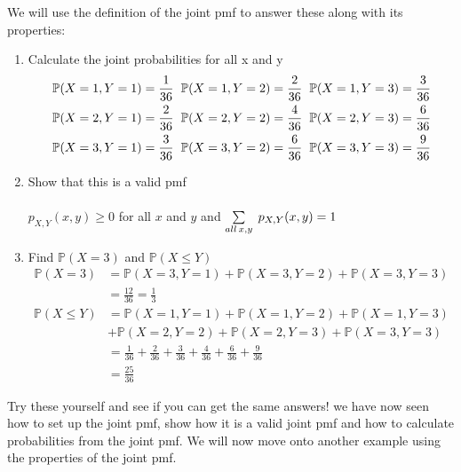 \documentclass[,oneside]{article}
\begin{document}
\begin{enumerate}
\begin{enumerate}
\end{enumerate}
We will use the definition of the joint pmf to answer these along with its properties:\\
\begin{enumerate}
\item Calculate the joint probabilities for all x and y
\begin{align*}
\mathbb{P}(X = 1, Y = 1) = \frac{1}{36} \hspace{0.2cm} \mathbb{P}(X = 1, Y = 2) = \frac{2}{36} \hspace{0.2cm} \mathbb{P}(X = 1, Y = 3) = \frac{3}{36}\\
\mathbb{P}(X = 2, Y = 1) = \frac{2}{36} \hspace{0.2cm} \mathbb{P}(X = 2, Y = 2) = \frac{4}{36} \hspace{0.2cm} \mathbb{P}(X = 2, Y = 3) = \frac{6}{36}\\
\mathbb{P}(X = 3, Y = 1) = \frac{3}{36} \hspace{0.2cm} \mathbb{P}(X = 3, Y = 2) = \frac{6}{36}\hspace{0.2cm}  \mathbb{P}(X = 3, Y = 3) = \frac{9}{36}
\end{align*}
\item Show that this is a valid pmf\\ \\
$p_{X,Y}(x,y) \geq 0$ for all $x$ and $y$ and $\sum\limits_{all \hspace{0.05cm}x,y} \hspace{0.1cm}p_{X,Y}(x,y)=1$\\
\item Find $\mathbb{P}(X = 3)$ and $\mathbb{P}(X \leq Y)$
\begin{align*}
\mathbb{P}(X=3)&=\mathbb{P}(X = 3, Y = 1)+\mathbb{P}(X = 3, Y = 2)+ \mathbb{P}(X = 3, Y = 3)\\
&= \frac{12}{36} = \frac{1}{3}
\end{align*}
\begin{align*}
\mathbb{P}(X \leq Y) &= \mathbb{P}(X = 1, Y = 1)+\mathbb{P}(X = 1, Y = 2)+\mathbb{P}(X = 1, Y = 3)\\
&+\mathbb{P}(X = 2, Y = 2)+\mathbb{P}(X = 2, Y = 3)+\mathbb{P}(X = 3, Y = 3)\\
&=\frac{1}{36}+\frac{2}{36}+\frac{3}{36}+\frac{4}{36}+\frac{6}{36}+\frac{9}{36}\\
&=\frac{25}{36}
\end{align*}
\end{enumerate}
Try these yourself and see if you can get the same answers! we have now seen how to set up the joint pmf, show how it is a valid joint pmf and how to calculate probabilities from the joint pmf. We will now move onto another example using the properties of the joint pmf.\\ \\ \\ \\

\end{enumerate}
\end{document}
